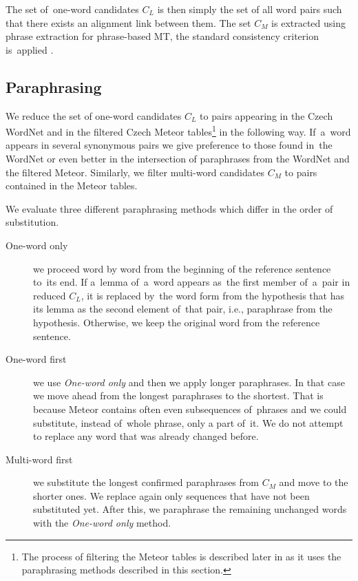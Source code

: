 The set of~one-word candidates $C_L$ is then simply the set of all word pairs such
that there exists an alignment link between them. The set $C_M$ is extracted 
using phrase extraction for phrase-based MT, the standard consistency criterion
is~applied \citep{Och99improvedalignment}.

\subsection{Paraphrasing}
\label{paraphrasing}
We reduce the set of one-word candidates $ C_{L} $ to pairs appearing in the 
Czech WordNet and in the filtered Czech Meteor tables\footnote{The process of 
filtering the Meteor tables is described later in  as it uses
the paraphrasing methods described in this section.} in the following way. 
If~a~word appears in several synonymous pairs we give preference 
to those found in~the WordNet or even better in the intersection of paraphrases 
from the WordNet and the filtered Meteor. Similarly, we filter multi-word 
candidates $ C_{M} $ to pairs contained in the Meteor tables.

We evaluate three different paraphrasing methods which differ in the order of
substitution.

\begin{description}
\item[One-word only] we proceed word by word from the beginning of the 
reference sentence to~its end. If a~lemma of~a~word appears as~the first member 
of~a~pair in reduced $ C_{L} $, it is replaced by~the word form from the 
hypothesis that has its lemma as the second element of~that pair, i.e., 
paraphrase from the hypothesis. Otherwise, we keep the original word from the 
reference sentence.
\item[One-word first] we use \textit{One-word only} and then we apply longer 
paraphrases. In that case we move ahead from the longest paraphrases to the 
shortest. That is because Meteor contains often even subsequences of~phrases 
and we could substitute, instead of~whole phrase, only a part of~it. We do not 
attempt to replace any word that was already changed before.
\item[Multi-word first] we substitute the longest confirmed paraphrases from
$ C_{M} $ and move to the shorter ones. We replace again only sequences that 
have not been substituted yet. After this, we paraphrase the remaining 
unchanged words with the \textit{One-word only} method.
\end{description}

